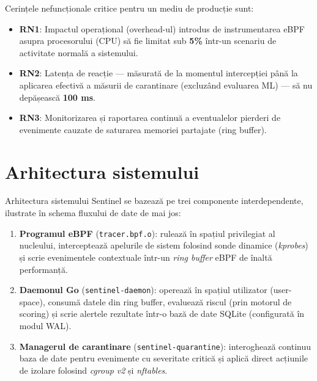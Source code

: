 \par Cerințele nefuncționale critice pentru un mediu de producție sunt:

\begin{itemize}
    \item \textbf{RN1}: Impactul operațional (overhead-ul) introdus de instrumentarea eBPF asupra procesorului (CPU) să fie limitat sub \textbf{5\%} într-un scenariu de activitate normală a sistemului.
    \item \textbf{RN2}: Latența de reacție --- măsurată de la momentul intercepției până la aplicarea efectivă a măsurii de carantinare (excluzând evaluarea ML) --- să nu depășească \textbf{100 ms}.
    \item \textbf{RN3}: Monitorizarea și raportarea continuă a eventualelor pierderi de evenimente cauzate de saturarea memoriei partajate (ring buffer).
\end{itemize}


\section{Arhitectura sistemului}
\label{sec:architecture}

\par Arhitectura sistemului Sentinel se bazează pe trei componente interdependente, ilustrate în schema fluxului de date de mai jos:

\begin{enumerate}
    \item \textbf{Programul eBPF} (\texttt{tracer.bpf.o}): rulează în spațiul privilegiat al nucleului, interceptează apelurile de sistem folosind sonde dinamice (\textit{kprobes}) și scrie evenimentele contextuale într-un \textit{ring buffer} eBPF de înaltă performanță.
    \item \textbf{Daemonul Go} (\texttt{sentinel-daemon}): operează în spațiul utilizator (user-space), consumă datele din ring buffer, evaluează riscul (prin motorul de scoring) și scrie alertele rezultate într-o bază de date SQLite (configurată în modul WAL).
    \item \textbf{Managerul de carantinare} (\texttt{sentinel-quarantine}): interoghează continuu baza de date pentru evenimente cu severitate critică și aplică direct acțiunile de izolare folosind \textit{cgroup v2} și \textit{nftables}.
\end{enumerate}

